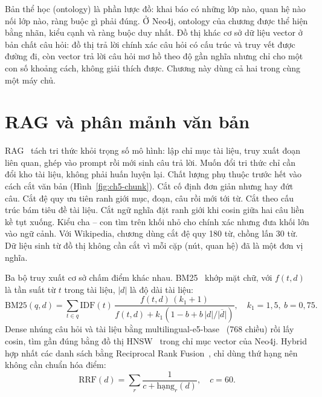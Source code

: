 
Bản thể học (ontology) là phần lược đồ: khai báo có những lớp nào, quan hệ nào nối lớp nào, ràng buộc gì phải đúng. Ở Neo4j, ontology của chương được thể hiện bằng nhãn, kiểu cạnh và ràng buộc duy nhất. Đồ thị khác cơ sở dữ liệu vector ở bản chất câu hỏi: đồ thị trả lời chính xác câu hỏi có cấu trúc và truy vết được đường đi, còn vector trả lời câu hỏi mơ hồ theo độ gần nghĩa nhưng chỉ cho một con số khoảng cách, không giải thích được. Chương này dùng cả hai trong cùng một máy chủ.

\section{RAG và phân mảnh văn bản}

RAG~\cite{ch5rag} tách tri thức khỏi trọng số mô hình: lập chỉ mục tài liệu, truy xuất đoạn liên quan, ghép vào prompt rồi mới sinh câu trả lời. Muốn đổi tri thức chỉ cần đổi kho tài liệu, không phải huấn luyện lại. Chất lượng phụ thuộc trước hết vào cách cắt văn bản (Hình~\ref{fig:ch5-chunk}). Cắt cố định đơn giản nhưng hay đứt câu. Cắt đệ quy ưu tiên ranh giới mục, đoạn, câu rồi mới tới từ. Cắt theo cấu trúc bám tiêu đề tài liệu. Cắt ngữ nghĩa đặt ranh giới khi cosin giữa hai câu liền kề tụt xuống. Kiểu cha -- con tìm trên khối nhỏ cho chính xác nhưng đưa khối lớn vào ngữ cảnh. Với Wikipedia, chương dùng cắt đệ quy 180 từ, chồng lấn 30 từ. Dữ liệu sinh từ đồ thị không cần cắt vì mỗi cặp (nút, quan hệ) đã là một đơn vị nghĩa.


Ba bộ truy xuất cơ sở chấm điểm khác nhau. BM25~\cite{ch5bm25} khớp mặt chữ, với $f(t,d)$ là tần suất từ $t$ trong tài liệu, $|d|$ là độ dài tài liệu:
\begin{equation}
\text{BM25}(q,d) = \sum_{t \in q} \text{IDF}(t)\,\frac{f(t,d)\,(k_1+1)}{f(t,d) + k_1\left(1 - b + b\,|d| / \overline{|d|}\right)},\quad k_1=1{,}5,\ b=0{,}75.
\end{equation}
Dense nhúng câu hỏi và tài liệu bằng multilingual-e5-base~\cite{ch5e5} (768 chiều) rồi lấy cosin, tìm gần đúng bằng đồ thị HNSW~\cite{ch5hnsw} trong chỉ mục vector của Neo4j. Hybrid hợp nhất các danh sách bằng Reciprocal Rank Fusion~\cite{ch5rrf}, chỉ dùng thứ hạng nên không cần chuẩn hóa điểm:
\begin{equation}
\text{RRF}(d) = \sum_{r} \frac{1}{c + \text{hạng}_r(d)},\quad c = 60.
\end{equation}


